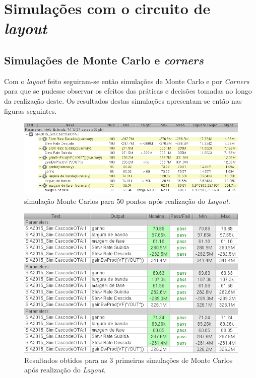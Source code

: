 \documentclass[11pt]{article}
\numberwithin{equation}{section}
\begin{document}

\section{Simulações com o circuito de \textit{layout}}

\subsection{Simulações de Monte Carlo e \textit{corners}}

Com o \textit{layout} feito seguiram-se então simulações de Monte Carlo e por \textit{Corners} para que se pudesse observar os efeitos das práticas e decisões tomadas ao longo da realização deste. Os resultados destas simulações apresentam-se então nas figuras seguintes.

\begin{figure}[H]
	\centering
	\includegraphics[keepaspectratio=true, scale=0.50]{exps/MonteCarlo_50pt_Novo_MultiTransistor_Layout}
	\vspace{-0.5em}
	\caption{simulação Monte Carlos para 50 pontos após realização do \textit{Layout}.}
	\vspace{-0.8em} 
\end{figure}

\begin{figure}[H]
	\centering
	\includegraphics[keepaspectratio=true, scale=0.50]{exps/MonteCarlo_3pt_Novo_MultiTransistor_Layout}
	\vspace{-0.5em}
	\caption{Resultados obtidos para as 3 primeiras simulações de Monte Carlos após realização do \textit{Layout}.}
	\vspace{-0.8em} 
\end{figure}
\end{document}
